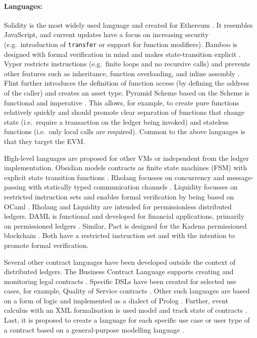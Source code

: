 \documentclass{llncs}
\begin{document}
\paragraph{Languages:}
Solidity is the most widely used language and created for Ethereum \cite{Ethereum2018Solidity}. It resembles JavaScript, and current updates have a focus on increasing security (e.g.\ introduction of \texttt{transfer} or support for function modifiers). 
Bamboo is designed with formal verification in mind and makes state-transition explicit \cite{Hirai2018Bamboo}. 
Vyper restricts instructions (e.g.\ finite loops and no recursive calls) and prevents other features such as inheritance, function overloading, and inline assembly \cite{Ethereum2018Vyper}. 
Flint further introduces the definition of function access (by defining the address of the caller) and creates an asset type. 
Pyramid Scheme based on the Scheme is functional and imperative \cite{Burge2018}. This allows, for example, to create pure functions relatively quickly and should promote clear separation of functions that change state (i.e.\ require a transaction on the ledger being invoked) and stateless functions (i.e.\ only local calls are required).
Common to the above languages is that they target the EVM.

High-level languages are proposed for other VMs or independent from the ledger implementation.
Obsidian models contracts as finite state machines (FSM) with explicit state transition functions \cite{Coblenz2017}.
Rholang focusses on concurrency and message-passing with statically typed communication channels \cite{Meredith2018}.
Liquidity focusses on restricted instruction sets and enables formal verification by being based on OCaml \cite{OCamlProSAS2018}.
Rholang and Liquidity are intended for permissionless distributed ledgers.
DAML is functional and developed for financial applications, primarily on permissioned ledgers \cite{Shaul2018,Meier2018,Lippmeier2018,Huschenbett2018,Bernauer2018,Maric2018,Bleikertz2018,Lochbihler2018,Pilav2018}.
Similar, Pact is designed for the Kadena permissioned blockchain \cite{Popejoy2017}.
Both have a restricted instruction set and with the intention to promote formal verification.

Several other contract languages have been developed outside the context of distributed ledgers. The Business Contract Language supports creating and monitoring legal contracts \cite{Neal.2003,Governatori2006}. Specific DSLs have been created for selected use cases, for example, Quality of Service contracts \cite{Braga2009}.
Other such languages are based on a form of logic and implemented as a dialect of Prolog \cite{Michael2010}.
Further, event calculus with an XML formalisation is used model and track state of contracts \cite{Farrell2004}.
Last, it is proposed to create a language for each specific use case or user type of a contract based on a general-purpose modelling language \cite{Burge2018DSL}.
\end{document}
